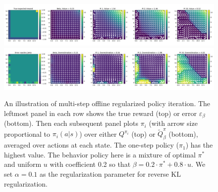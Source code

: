 \begin{figure}[h]
    \centering
    \includegraphics[width=\textwidth]{figures/offline-rl/gridworld/gridworld_flat.png}
    \includegraphics[width=\textwidth]{figures/offline-rl/gridworld/gridworld_error.png}
    \caption{An illustration of multi-step offline regularized policy iteration. The leftmost panel in each row shows the true reward (top) or error $ \varepsilon_\beta$ (bottom). Then each subsequent panel plots $ \pi_i$ (with arrow size proportional to $ \pi_i(a|s)$) over either $ Q^{\pi_i}$ (top) or $ \widetilde Q^{\pi}_\beta $ (bottom), averaged over actions at each state. The one-step policy ($ \pi_1$) has the highest value. The behavior policy here is a mixture of optimal $ \pi^*$ and uniform $ u $ with coefficient 0.2 so that $\beta = 0.2 \cdot \pi^* + 0.8 \cdot u$. We set $ \alpha = 0.1$ as the regularization parameter for reverse KL regularization.}
    \label{fig:gridworld}
\end{figure}


